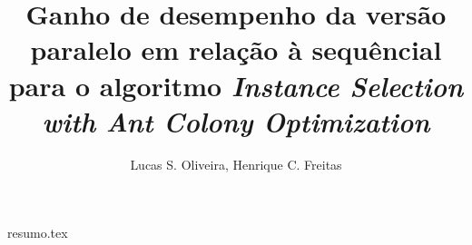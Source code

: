 \documentclass[12pt]{article}
\title{Ganho de desempenho da versão paralelo em relação à sequêncial para o algoritmo \emph{Instance Selection with Ant Colony Optimization}}
\author{{Lucas S. Oliveira\inst{1}, Henrique C. Freitas\inst{1}}}
\begin{document}
 

\maketitle

{resumo.tex}
\end{document}
